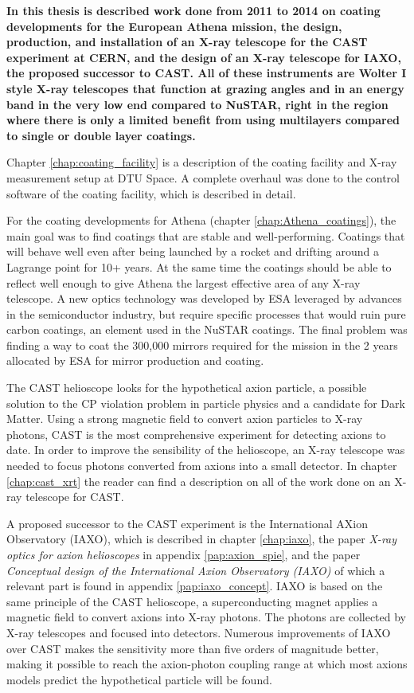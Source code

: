 {\bf In this thesis is described work done from 2011 to 2014 on coating developments for the European Athena mission, the design, production, and installation of an X-ray telescope for the CAST experiment at CERN, and the design of an X-ray telescope for IAXO, the proposed successor to CAST. All of these instruments are Wolter I style X-ray telescopes that function at grazing angles and in an energy band in the very low end compared to NuSTAR, right in the region where there is only a limited benefit from using multilayers compared to single or double layer coatings. }

Chapter \ref{chap:coating_facility} is a description of the coating facility and X-ray measurement setup at DTU Space. A complete overhaul was done to the control software of the coating facility, which is described in detail.

For the coating developments for Athena (chapter \ref{chap:Athena_coatings}), the main goal was to find coatings that are stable and well-performing. Coatings that will behave well even after being launched by a rocket and drifting around a Lagrange point for 10+ years. At the same time the coatings should be able to reflect well enough to give Athena the largest effective area of any X-ray telescope. A new optics technology was developed by ESA leveraged by advances in the semiconductor industry, but require specific processes that would ruin pure carbon coatings, an element used in the NuSTAR coatings. The final problem was finding a way to coat the 300,000 mirrors required for the mission in the 2 years allocated by ESA for mirror production and coating.

The CAST helioscope looks for the hypothetical axion particle, a possible solution to the CP violation problem in particle physics and a candidate for Dark Matter. Using a strong magnetic field to convert axion particles to X-ray photons, CAST is the most comprehensive experiment for detecting axions to date. In order to improve the sensibility of the helioscope, an X-ray telescope was needed to focus photons converted from axions into a small detector. In chapter \ref{chap:cast_xrt} the reader can find a description on all of the work done on an X-ray telescope for CAST.

A proposed successor to the CAST experiment is the International AXion Observatory (IAXO), which is described in chapter \ref{chap:iaxo}, the paper \emph{X-ray optics for axion helioscopes} in appendix \ref{pap:axion_spie}, and the paper \emph{Conceptual design of the International Axion Observatory (IAXO)} of which a relevant part is found in appendix \ref{pap:iaxo_concept}. IAXO is based on the same principle of the CAST helioscope, a superconducting magnet applies a magnetic field to convert axions into X-ray photons. The photons are collected by X-ray telescopes and focused into detectors. Numerous improvements of IAXO over CAST makes the sensitivity more than five orders of magnitude better, making it possible to reach the axion-photon coupling range at which most axions models predict the hypothetical particle will be found.

